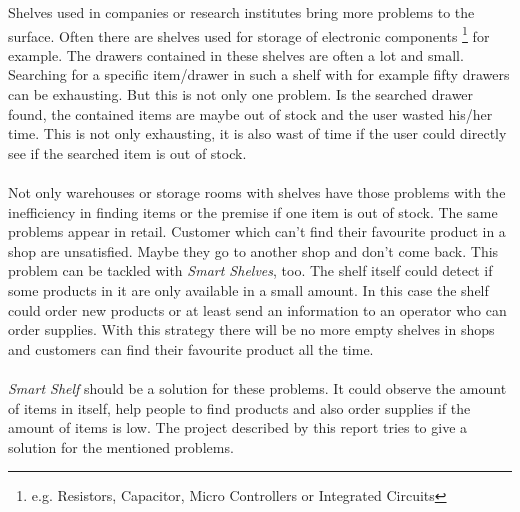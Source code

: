Shelves used in companies or research institutes bring more problems to the surface. 
Often there are shelves used for storage of electronic components
\footnote{e.g. Resistors, Capacitor, Micro Controllers or Integrated Circuits} for example. 
The drawers contained in these shelves are often a lot and small. 
Searching for a specific item/drawer in such a shelf with for example fifty drawers can be exhausting. 
But this is not only one problem. 
Is the searched drawer found, the contained items are maybe out of stock and the user wasted his/her time. 
This is not only exhausting, it is also wast of time if the user could directly see if the searched item is out of stock. 
\\
\\
Not only warehouses or storage rooms with shelves have those problems with the inefficiency in finding items or the premise if one item is out of stock. 
The same problems appear in retail. 
Customer which can't find their favourite product in a shop are unsatisfied. 
Maybe they go to another shop and don't come back. 
This problem can be tackled with \textit{Smart Shelves}, too. 
The shelf itself could detect if some products in it are only available in a small amount. 
In this case the shelf could order new products or at least send an information to an operator who can order supplies. 
With this strategy there will be no more empty shelves in shops and customers can find their favourite product all the time. 
\\
\\
\textit{Smart Shelf} should be a solution for these problems. 
It could observe the amount of items in itself, help people to find products and also order supplies if the amount of items is low. 
The project described by this report tries to give a solution for the mentioned problems. 